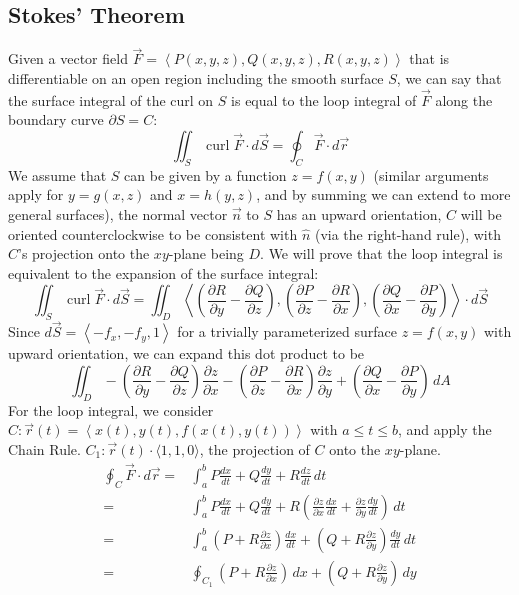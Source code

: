 \documentclass{article}
\DeclareMathOperator{\curl}{curl}
\newcommand{\vect}[1]{\ensuremath{\overrightarrow{#1}}}
\begin{document}
\subsection{Stokes' Theorem}
Given a vector field $\vect{F}=\left\langle P(x,y,z), Q(x,y,z), R(x,y,z) \right\rangle$ that is differentiable on an open region including the smooth surface $S$, we can say that the surface integral of the curl on $S$ is equal to the loop integral of $\vect{F}$ along the boundary curve $\partial S = C$:
$$\iint_S\curl{\vect{F}}\cdot d\vect{S}=\oint_C\vect{F}\cdot d\vect{r}$$
We assume that $S$ can be given by a function $z=f(x,y)$ (similar arguments apply for $y=g(x,z)$ and $x=h(y,z)$, and by summing we can extend to more general surfaces), the normal vector $\vect{n}$ to $S$ has an upward orientation, $C$ will be oriented counterclockwise to be consistent with $\hat{n}$ (via the right-hand rule), with $C$'s projection onto the $xy$-plane being $D$. We will prove that the loop integral is equivalent to the expansion of the surface integral:
$$\iint_S\curl{\vect{F}}\cdot d\vect{S}=\iint_D \left\langle\left(\frac{\partial R}{\partial y} - \frac{\partial Q}{\partial z}\right),\left(\frac{\partial P}{\partial z} - \frac{\partial R}{\partial x}\right),\left(\frac{\partial Q}{\partial x} - \frac{\partial P}{\partial y}\right)\right\rangle\cdot d\vect{S}$$
Since $d\vect{S} = \left\langle -f_x,-f_y, 1\right\rangle$ for a trivially parameterized surface $z=f(x,y)$ with upward orientation, we can expand this dot product to be
$$\iint_D -\left(\frac{\partial R}{\partial y} - \frac{\partial Q}{\partial z}\right)\frac{\partial z}{\partial x}-\left(\frac{\partial P}{\partial z} - \frac{\partial R}{\partial x}\right)\frac{\partial z}{\partial y}+\left(\frac{\partial Q}{\partial x} - \frac{\partial P}{\partial y}\right)\,dA$$
For the loop integral, we consider $C: \vect{r}(t)=\left\langle x(t), y(t), f(x(t), y(t)) \right\rangle$ with $a\le t \le b$, and apply the Chain Rule. $C_1: \vect{r}(t)\cdot\langle1,1,0\rangle$, the projection of $C$ onto the $xy$-plane.
\begin{align*}
    \oint_C\vect{F}\cdot d\vect{r} =& \int_a^b P\frac{dx}{dt}+Q\frac{dy}{dt}+R\frac{dz}{dt}\,dt\\
    =& \int_a^b P\frac{dx}{dt}+Q\frac{dy}{dt}+R\left(\frac{\partial z}{\partial x}\frac{dx}{dt}+\frac{\partial z}{\partial y}\frac{dy}{dt}\right)\,dt\\
    =& \int_a^b \left(P + R\frac{\partial z}{\partial x} \right)\frac{dx}{dt}+\left(Q + R\frac{\partial z}{\partial y}\right)\frac{dy}{dt}\,dt\\
    =& \oint_{C_1} \left(P + R\frac{\partial z}{\partial x} \right)\,dx+\left(Q + R\frac{\partial z}{\partial y}\right)\,dy
\end{align*}
\end{document}
